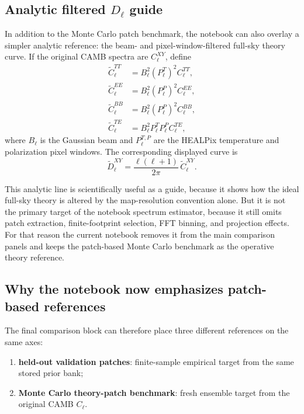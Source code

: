 \documentclass[11pt]{article}
\begin{document}
\subsection{Analytic filtered \(D_\ell\) guide}

In addition to the Monte Carlo patch benchmark, the notebook can also overlay a simpler analytic reference: the beam- and pixel-window-filtered full-sky theory curve. If the original CAMB spectra are \(C_\ell^{XY}\), define
\begin{align}
  \widetilde C_\ell^{TT} &= B_\ell^2 (P_\ell^T)^2 C_\ell^{TT},\\
  \widetilde C_\ell^{EE} &= B_\ell^2 (P_\ell^P)^2 C_\ell^{EE},\\
  \widetilde C_\ell^{BB} &= B_\ell^2 (P_\ell^P)^2 C_\ell^{BB},\\
  \widetilde C_\ell^{TE} &= B_\ell^2 P_\ell^T P_\ell^P C_\ell^{TE},
\end{align}
where \(B_\ell\) is the Gaussian beam and \(P_\ell^{T,P}\) are the HEALPix temperature and polarization pixel windows. The corresponding displayed curve is
\begin{equation}
  \widetilde D_\ell^{XY}
  =
  \frac{\ell(\ell+1)}{2\pi}\,\widetilde C_\ell^{XY}.
\end{equation}

This analytic line is scientifically useful as a guide, because it shows how the ideal full-sky theory is altered by the map-resolution convention alone. But it is not the primary target of the notebook spectrum estimator, because it still omits patch extraction, finite-footprint selection, FFT binning, and projection effects. For that reason the current notebook removes it from the main comparison panels and keeps the patch-based Monte Carlo benchmark as the operative theory reference.

\subsection{Why the notebook now emphasizes patch-based references}

The final comparison block can therefore place three different references on the same axes:
\begin{enumerate}[leftmargin=1.5em]
  \item \textbf{held-out validation patches}: finite-sample empirical target from the same stored prior bank;
  \item \textbf{Monte Carlo theory-patch benchmark}: fresh ensemble target from the original CAMB \(C_\ell\).
\end{enumerate}
\end{document}
